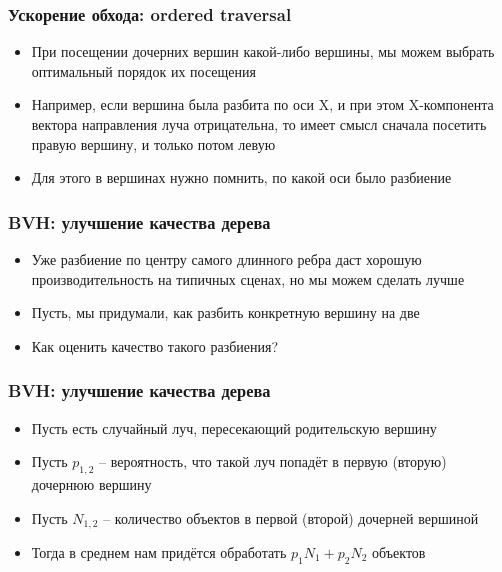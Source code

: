 \documentclass[handout,10pt]{beamer}
\begin{document}
\begin{frame}[fragile]
\frametitle{Ускорение обхода: ordered traversal}
\begin{itemize}
\item При посещении дочерних вершин какой-либо вершины, мы можем выбрать оптимальный порядок их посещения
\pause
\item Например, если вершина была разбита по оси X, и при этом X-компонента вектора направления луча отрицательна, то имеет смысл сначала посетить правую вершину, и только потом левую
\pause
\item Для этого в вершинах нужно помнить, по какой оси было разбиение
\end{itemize}
\end{frame}

\begin{frame}[fragile]
\frametitle{BVH: улучшение качества дерева}
\begin{itemize}
\item Уже разбиение по центру самого длинного ребра даст хорошую производительность на типичных сценах, но мы можем сделать лучше
\pause
\item Пусть, мы придумали, как разбить конкретную вершину на две
\pause
\item Как оценить качество такого разбиения?
\end{itemize}
\end{frame}

\begin{frame}[fragile]
\frametitle{BVH: улучшение качества дерева}
\begin{itemize}
\item Пусть есть случайный луч, пересекающий родительскую вершину
\pause
\item Пусть \begin{math}p_{1,2}\end{math} -- вероятность, что такой луч попадёт в первую (вторую) дочернюю вершину
\pause
\item Пусть \begin{math}N_{1,2}\end{math} -- количество объектов в первой (второй) дочерней вершиной
\pause
\item Тогда в среднем нам придётся обработать \begin{math}p_1N_1+p_2N_2\end{math} объектов
\end{itemize}
\end{frame}
\end{document}
